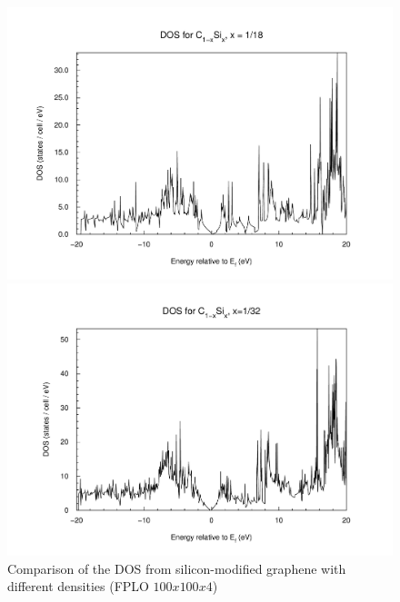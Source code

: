 \begin{figure}
\begin{minipage}[t]{0.3\textwidth}
					\end{minipage}
					\begin{minipage}[t]{0.3\textwidth}
						\includegraphics[width=\textwidth]{Results/Silicon/Silicon3/silicon3dos.pdf}
					\end{minipage}
					\begin{minipage}[t]{0.3\textwidth}
						\includegraphics[width=\textwidth]{Results/Silicon/Silicon4/silicon4dos.pdf}
					\end{minipage}															
					\caption{Comparison of the DOS from silicon-modified graphene with different densities (FPLO $100x100x4$)}
					\label{fig:SiliconDOSComparisson}
				\end{figure}
				
				
					
				
				

				
			
	
	
			
		
		
		
			
		
		
		
		
		
		
		
			 
		
		

		